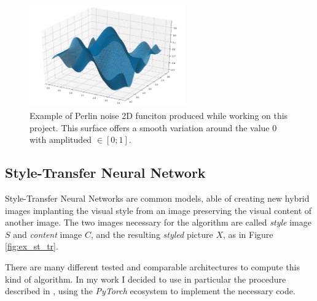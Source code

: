 \begin{figure}
    \centering
    \includegraphics[width = 0.6\textwidth]{images/perlin}
    \caption{Example of Perlin noise 2D funciton produced while working on this project. This surface offers a smooth variation around the value 0 with amplituded $ \in [ 0;1] $.}
    \label{fig:my_perlin}
\end{figure}


\subsection{Style-Transfer Neural Network}
\label{ssec:sttrNN}
Style-Transfer Neural Networks are common models, able of creating new hybrid images implanting the visual style from an image preserving the visual content of another image. The two images necessary for the algorithm are called \textit{style} image $S$ and \textit{content} image $C$, and the resulting \textit{styled} picture $X$, as in Figure \ref{fig:ex_st_tr}.

There are many different tested and comparable architectures to compute this kind of algorithm. In my work I decided to use in particular the procedure described in \cite{1508.06576}, using the \textit{PyTorch} ecosystem to implement the necessary code.

